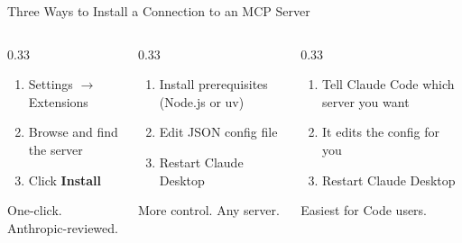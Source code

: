 \documentclass[aspectratio=169]{beamer}
\begin{document}
\begin{frame}{Three Ways to Install a Connection to an MCP Server}
\begin{columns}[T]
\begin{column}{0.33\textwidth}
\begin{shadedbox}[title=\textbf{Desktop Extensions}]
\begin{enumerate}\small
  \item Settings $\rightarrow$ Extensions
  \item Browse and find the server
  \item Click \textbf{Install}
\end{enumerate}
\vspace{0.2cm}
One-click. Anthropic-reviewed.
\end{shadedbox}
\end{column}
\begin{column}{0.33\textwidth}
\begin{shadedbox}[title=\textbf{Manual Config}]
\begin{enumerate}\small
  \item Install prerequisites (Node.js or uv)
  \item Edit JSON config file
  \item Restart Claude Desktop
\end{enumerate}
\vspace{0.2cm}
More control. Any server.
\end{shadedbox}
\end{column}
\begin{column}{0.33\textwidth}
\begin{shadedbox}[title=\textbf{Ask Claude Code}]
\begin{enumerate}\small
  \item Tell Claude Code which server you want
  \item It edits the config for you
  \item Restart Claude Desktop
\end{enumerate}
\vspace{0.2cm}
Easiest for Code users.
\end{shadedbox}
\end{column}
\end{columns}
\end{frame}
\end{document}
